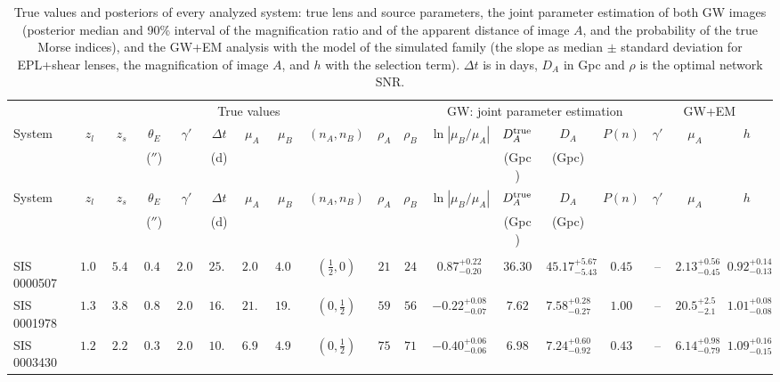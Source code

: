 \begin{longtable}{@{}lccccccccccccccccc@{}}
\caption{True values and posteriors of every analyzed system: true lens and source parameters, the joint parameter estimation of both GW images (posterior median and 90\% interval of the magnification ratio and of the apparent distance of image $A$, and the probability of the true Morse indices), and the GW+EM analysis with the model of the simulated family (the slope as median $\pm$ standard deviation for EPL+shear lenses, the magnification of image $A$, and $h$ with the selection term). $\Delta t$ is in days, $D_A$ in Gpc and $\rho$ is the optimal network SNR.}\label{tab:persystem}\\
\toprule
& \multicolumn{10}{c}{True values} & \multicolumn{4}{c}{GW: joint parameter estimation} & \multicolumn{3}{c}{GW+EM}\\
\cmidrule(lr){2-11}\cmidrule(lr){12-15}\cmidrule(l){16-18}
System & $z_l$ & $z_s$ & $\theta_E$ & $\gamma'$ & $\Delta t$ & $\mu_A$ & $\mu_B$ & $(n_A,n_B)$ & $\rho_A$ & $\rho_B$ & $\ln|\mu_B/\mu_A|$ & $D_A^{\rm true}$ & $D_A$ & $P(n)$ & $\gamma'$ & $\mu_A$ & $h$\\
 & & & ($''$) & & (d) & & & & & & & (Gpc) & (Gpc) & & & & \\
\midrule
\endfirsthead
\toprule
System & $z_l$ & $z_s$ & $\theta_E$ & $\gamma'$ & $\Delta t$ & $\mu_A$ & $\mu_B$ & $(n_A,n_B)$ & $\rho_A$ & $\rho_B$ & $\ln|\mu_B/\mu_A|$ & $D_A^{\rm true}$ & $D_A$ & $P(n)$ & $\gamma'$ & $\mu_A$ & $h$\\
 & & & ($''$) & & (d) & & & & & & & (Gpc) & (Gpc) & & & & \\
\midrule
\endhead
\bottomrule
\endfoot
\multicolumn{18}{@{}l}{\emph{Einstein Telescope}}\\
SIS 0000507 & $1.05$ & $5.41$ & $0.47$ & $2.00$ & $25.3$ & $2.07$ & $4.07$ & $(\frac12,0)$ & $21$ & $24$ & $0.87^{+0.22}_{-0.20}$ & $36.30$ & $45.17^{+5.67}_{-5.43}$ & $0.45$ & -- & $2.13^{+0.56}_{-0.45}$ & $0.92^{+0.14}_{-0.13}$\\
SIS 0001978 & $1.31$ & $3.87$ & $0.81$ & $2.00$ & $16.9$ & $21.4$ & $19.4$ & $(0,\frac12)$ & $59$ & $56$ & $-0.22^{+0.08}_{-0.07}$ & $7.62$ & $7.58^{+0.28}_{-0.27}$ & $1.00$ & -- & $20.5^{+2.5}_{-2.1}$ & $1.01^{+0.08}_{-0.08}$\\
SIS 0003430 & $1.21$ & $2.24$ & $0.30$ & $2.00$ & $10.6$ & $6.90$ & $4.90$ & $(0,\frac12)$ & $75$ & $71$ & $-0.40^{+0.06}_{-0.06}$ & $6.98$ & $7.24^{+0.60}_{-0.92}$ & $0.43$ & -- & $6.14^{+0.98}_{-0.79}$ & $1.09^{+0.16}_{-0.15}$\\

\end{longtable}
